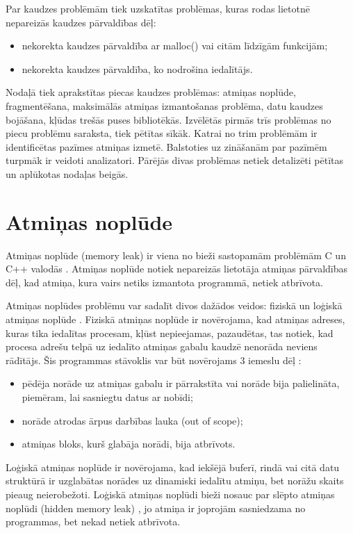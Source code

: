﻿ \label{sec:problems}
Par kaudzes problēmām tiek uzskatītas problēmas, kuras rodas lietotnē nepareizās kaudzes pārvaldības dēļ: 
\begin{itemize}
\item nekorekta kaudzes pārvaldība ar malloc() vai citām līdzīgām funkcijām;
\item nekorekta kaudzes pārvaldība, ko nodrošina iedalītājs.
\end{itemize}

Nodaļā tiek aprakstītas piecas kaudzes problēmas: atmiņas noplūde, fragmentēšana, maksimālās atmiņas izmantošanas problēma, datu kaudzes bojāšana, kļūdas trešās puses bibliotēkās.
Izvēlētās pirmās trīs problēmas no piecu problēmu saraksta, tiek pētītas sīkāk. 
Katrai no trim problēmām ir identificētas pazīmes atmiņas izmetē.
Balstoties uz zināšanām par pazīmēm turpmāk ir veidoti analizatori.
Pārējās divas problēmas netiek detalizēti pētītas un aplūkotas nodaļas beigās.

\section{Atmiņas noplūde}

Atmiņas noplūde (memory leak) ir viena no bieži sastopamām problēmām C un C++ valodās \cite{GNED}.
Atmiņas noplūde notiek nepareizās lietotāja atmiņas pārvaldības dēļ, kad atmiņa, kura vairs netiks izmantota programmā, netiek atbrīvota.

Atmiņas noplūdes problēmu var sadalīt divos dažādos veidos: fiziskā un loģiskā atmiņas noplūde \cite{JMMR}.
Fiziskā atmiņas noplūde ir novērojama, kad atmiņas adreses, kuras tika iedalītas procesam,  kļūst nepieejamas, pazaudētas, tas notiek, kad procesa adrešu telpā uz iedalīto atmiņas gabalu kaudzē nenorāda neviens rādītājs.
Šis programmas stāvoklis var būt novērojams 3 iemeslu dēļ \cite{JMMR}:
\begin{itemize}
\item pēdēja norāde uz atmiņas gabalu ir pārrakstīta vai norāde bija palielināta, piemēram, lai sasniegtu datus ar nobīdi;
\item norāde atrodas ārpus darbības lauka (out of scope);
\item atmiņas bloks, kurš glabāja norādi, bija atbrīvots.
\end{itemize}

Loģiskā atmiņas noplūde ir novērojama, kad iekšējā buferī, rindā vai citā datu struktūrā ir uzglabātas norādes uz dinamiski iedalītu atmiņu, bet norāžu skaits pieaug neierobežoti.
Loģiskā atmiņas noplūdi bieži nosauc par slēpto atmiņas noplūdi (hidden memory leak) \cite{RRUU}, jo atmiņa ir joprojām sasniedzama no programmas, bet nekad netiek atbrīvota.

